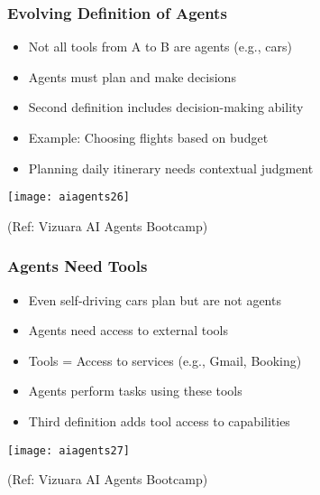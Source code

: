 \begin{frame}[fragile]\frametitle{Evolving Definition of Agents}

      \begin{itemize}
		\item Not all tools from A to B are agents (e.g., cars)
		\item Agents must plan and make decisions
		\item Second definition includes decision-making ability
		\item Example: Choosing flights based on budget
		\item Planning daily itinerary needs contextual judgment
      \end{itemize}

		\begin{center}
		\texttt{[image: aiagents26]}
		
		{\tiny (Ref: Vizuara AI Agents Bootcamp)}
		\end{center}	

\end{frame}

\begin{frame}[fragile]\frametitle{Agents Need Tools}

      \begin{itemize}
        \item Even self-driving cars plan but are not agents
        \item Agents need access to external tools
        \item Tools = Access to services (e.g., Gmail, Booking)
        \item Agents perform tasks using these tools
        \item Third definition adds tool access to capabilities
      \end{itemize}

		\begin{center}
		\texttt{[image: aiagents27]}
		
		{\tiny (Ref: Vizuara AI Agents Bootcamp)}
		\end{center}	

\end{frame}

